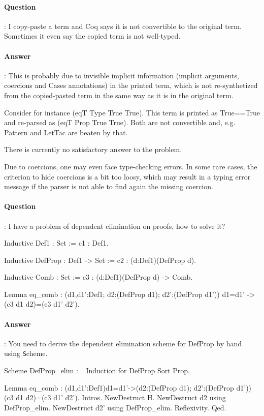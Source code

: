 \documentclass{article}
\newcommand{\coqtt}[1]{{\tt #1}}
\begin{document}
\paragraph{Question}: I copy-paste a term and Coq says it is not convertible
to the original term. Sometimes it even say the copied term is not
well-typed.

\paragraph{Answer}: This is probably due to invisible implicit information (implicit
arguments, coercions and Cases annotations) in the printed term, which
is not re-synthetized from the copied-pasted term in the same way as
it is in the original term.

  Consider for instance (eqT Type True True). This term is printed as
True==True and re-parsed as (eqT Prop True True). Both are not
convertible and, e.g. Pattern and LetTac are beaten by that.

  There is currently no satisfactory answer to the problem.
 
  Due to coercions, one may even face type-checking errors. In some
rare cases, the criterion to hide coercions is a bit too loosy, which
may result in a typing error message if the parser is not able to find
again the missing coercion.

\paragraph{Question}: I have a problem of dependent elimination on
proofs, how to solve it?

\begin{coq_example*}
Inductive Def1 : Set
   := c1 : Def1.

Inductive DefProp : Def1 -> Set
   := c2 : (d:Def1)(DefProp d).

Inductive Comb : Set
   := c3 : (d:Def1)(DefProp d) -> Comb.

Lemma eq_comb
   : (d1,d1':Def1; d2:(DefProp d1); d2':(DefProp d1')) d1=d1' ->
     (c3 d1 d2)=(c3 d1' d2').
\end{coq_example*}

\paragraph{Answer}: You need to derive the dependent elimination
scheme for DefProp by hand using {\coqtt Scheme}.

\begin{coq_example*}
Scheme DefProp_elim := Induction for DefProp Sort Prop.

Lemma eq_comb
   : (d1,d1':Def1)d1=d1'->(d2:(DefProp d1); d2':(DefProp d1'))
     (c3 d1 d2)=(c3 d1' d2').
Intros.
NewDestruct H.
NewDestruct d2 using DefProp_elim.
NewDestruct d2' using DefProp_elim.
Reflexivity.
Qed.
\end{coq_example*}
\end{document}
